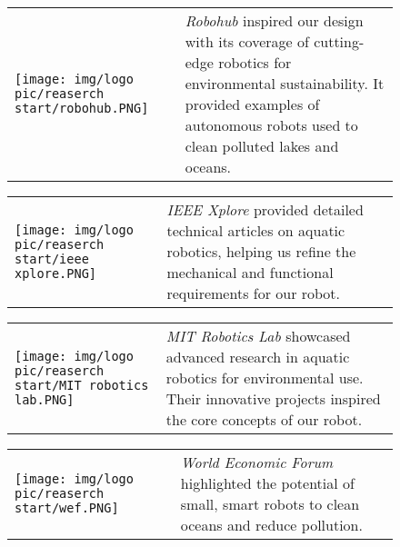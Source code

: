 \begin{figure}[H]
    \centering
    \begin{tabular}{m{} m{}}
        \texttt{[image: img/logo pic/reaserch start/robohub.PNG]} & 
        \textit{\color{navy}Robohub} inspired our design with its coverage of cutting-edge robotics for environmental sustainability. It provided examples of autonomous robots used to clean polluted lakes and oceans.
    \end{tabular}
\end{figure}

\vspace{1cm}


\begin{figure}[H]
    \centering
    \begin{tabular}{m{} m{}}
        \texttt{[image: img/logo pic/reaserch start/ieee xplore.PNG]} & 
        \textit{\color{navy}IEEE Xplore} provided detailed technical articles on aquatic robotics, helping us refine the mechanical and functional requirements for our robot.
    \end{tabular}
\end{figure}

\vspace{1cm}


\begin{figure}[H]
    \centering
    \begin{tabular}{m{} m{}}
        \texttt{[image: img/logo pic/reaserch start/MIT robotics lab.PNG]} & 
        \textit{\color{navy}MIT Robotics Lab} showcased advanced research in aquatic robotics for environmental use. Their innovative projects inspired the core concepts of our robot.
    \end{tabular}
\end{figure}

\vspace{1cm}


\begin{figure}[H]
 
    \begin{tabular}{m{} m{}}
        \texttt{[image: img/logo pic/reaserch start/wef.PNG]} &
        \textit{\color{navy}World Economic Forum} highlighted the potential of small, smart robots to clean oceans and reduce pollution. 
    \end{tabular}
\end{figure}

